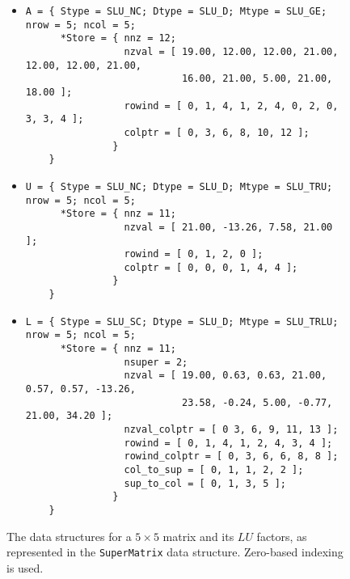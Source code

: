 \begin{figure}[tbp]
\begin{itemize}
\item \begin{verbatim}
A = { Stype = SLU_NC; Dtype = SLU_D; Mtype = SLU_GE; nrow = 5; ncol = 5;
      *Store = { nnz = 12;
                 nzval = [ 19.00, 12.00, 12.00, 21.00, 12.00, 12.00, 21.00,
                           16.00, 21.00, 5.00, 21.00, 18.00 ];
                 rowind = [ 0, 1, 4, 1, 2, 4, 0, 2, 0, 3, 3, 4 ];
                 colptr = [ 0, 3, 6, 8, 10, 12 ];
               }
    }
      \end{verbatim}
\item \begin{verbatim}
U = { Stype = SLU_NC; Dtype = SLU_D; Mtype = SLU_TRU; nrow = 5; ncol = 5;
      *Store = { nnz = 11;
                 nzval = [ 21.00, -13.26, 7.58, 21.00 ];
                 rowind = [ 0, 1, 2, 0 ];
                 colptr = [ 0, 0, 0, 1, 4, 4 ];
               }
    }
      \end{verbatim}
\item \begin{verbatim}
L = { Stype = SLU_SC; Dtype = SLU_D; Mtype = SLU_TRLU; nrow = 5; ncol = 5;
      *Store = { nnz = 11;
                 nsuper = 2;
                 nzval = [ 19.00, 0.63, 0.63, 21.00, 0.57, 0.57, -13.26,
                           23.58, -0.24, 5.00, -0.77, 21.00, 34.20 ];
                 nzval_colptr = [ 0 3, 6, 9, 11, 13 ];
                 rowind = [ 0, 1, 4, 1, 2, 4, 3, 4 ];
                 rowind_colptr = [ 0, 3, 6, 6, 8, 8 ];
                 col_to_sup = [ 0, 1, 1, 2, 2 ];
                 sup_to_col = [ 0, 1, 3, 5 ];
               }
    }
      \end{verbatim}
\end{itemize}
\caption{The data structures for a $5\times 5$ matrix and its $LU$ factors, 
        as represented in the {\tt SuperMatrix} data structure.
	Zero-based indexing is used.}
  \label{fig:matrixeg}
\end{figure}
